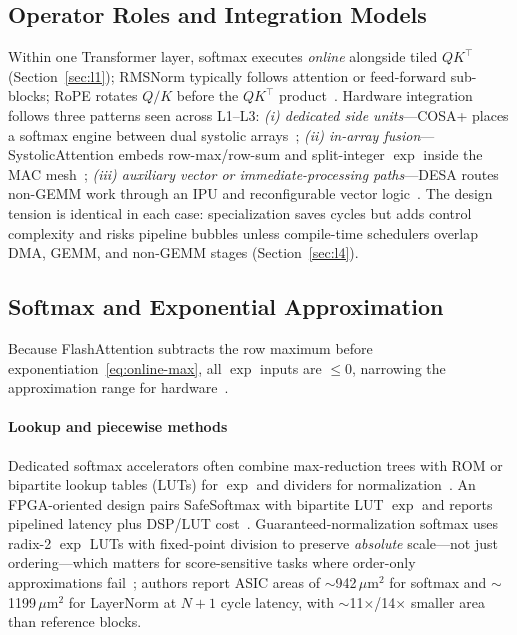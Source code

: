 \documentclass[conference]{IEEEtran}
\begin{document}
\subsection{Operator Roles and Integration Models}
\label{sec:l3-operators}

Within one Transformer layer, softmax executes \emph{online} alongside tiled $QK^\top$ (Section~\ref{sec:l1}); RMSNorm typically follows attention or feed-forward sub-blocks; RoPE rotates $Q/K$ before the $QK^\top$ product~\cite{su2024roformer,zhang2019root}.
Hardware integration follows three patterns seen across L1--L3:
\emph{(i) dedicated side units}---COSA+ places a softmax engine between dual systolic arrays~\cite{wang2023cosa};
\emph{(ii) in-array fusion}---SystolicAttention embeds row-max/row-sum and split-integer $\exp$ inside the MAC mesh~\cite{lin2025systolicattention,koca2023exp};
\emph{(iii) auxiliary vector or immediate-processing paths}---DESA routes non-GEMM work through an IPU and reconfigurable vector logic~\cite{desa2025}.
The design tension is identical in each case: specialization saves cycles but adds control complexity and risks pipeline bubbles unless compile-time schedulers overlap DMA, GEMM, and non-GEMM stages (Section~\ref{sec:l4}).

\subsection{Softmax and Exponential Approximation}
\label{sec:l3-softmax}

Because FlashAttention subtracts the row maximum before exponentiation~\eqref{eq:online-max}, all $\exp$ inputs are $\leq 0$, narrowing the approximation range for hardware~\cite{dao2022flashattention,lin2025systolicattention}.

\paragraph{Lookup and piecewise methods}
Dedicated softmax accelerators often combine max-reduction trees with ROM or bipartite lookup tables (LUTs) for $\exp$ and dividers for normalization~\cite{softmaxrmsnorm2026,guaranteednorm2026,mive2026,ham2021a3}.
An FPGA-oriented design pairs SafeSoftmax with bipartite LUT $\exp$ and reports pipelined latency plus DSP/LUT cost~\cite{softmaxrmsnorm2026}.
Guaranteed-normalization softmax uses radix-2 $\exp$ LUTs with fixed-point division to preserve \emph{absolute} scale---not just ordering---which matters for score-sensitive tasks where order-only approximations fail~\cite{guaranteednorm2026}; authors report ASIC areas of $\sim$942\,$\mu$m$^2$ for softmax and $\sim$1199\,$\mu$m$^2$ for LayerNorm at $N{+}1$ cycle latency, with $\sim$11$\times$/14$\times$ smaller area than reference blocks.
\end{document}
